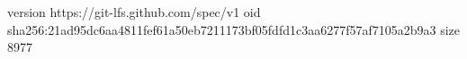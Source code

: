 version https://git-lfs.github.com/spec/v1
oid sha256:21ad95dc6aa4811fef61a50eb7211173bf05fdfd1c3aa6277f57af7105a2b9a3
size 8977
